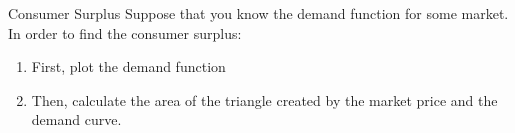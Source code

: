 \documentclass{beamer}
\begin{document}
\begin{frame}{Consumer Surplus}
  Suppose that you know the demand function for some market. In order to find the consumer surplus: 

  \begin{enumerate}
    \item First, plot the demand function

    \item Then, calculate the area of the triangle created by the market price and the demand curve.
  \end{enumerate}
\end{frame}
\end{document}

